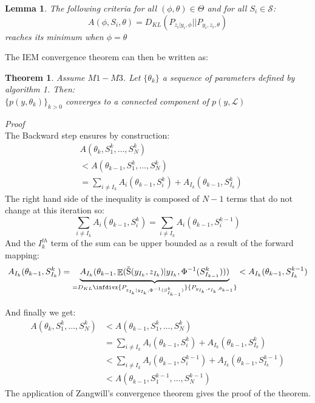 \documentclass{article}
\theoremstyle{plain}
\newtheorem{lemma}{Lemma}
\DeclareMathOperator*{\E}{\mathbb{E}}
\DeclareMathOperator*{\St}{\tilde{S}}
\theoremstyle{plain}
\newtheorem{thm}{Theorem}
\theoremstyle{definition}
\newcommand{\infdiv}{D_{KL}\infdivx}
\begin{document}
\begin{lemma}\label{lma1}
The following criteria for all $(\phi, \theta) \in \Theta$ and for all $S_i \in \mathcal{S}$:
\begin{equation}
 A(\phi,S_i,\theta) = D_{KL}(P_{z_i|y_i,\phi}||P_{y_i,z_i,\theta})
\end{equation}
reaches its minimum when $\phi = \theta$
\end{lemma}

The IEM convergence theorem can then be written as:
\begin{thm}
Assume $M1-M3$. Let $\{\theta_k\}$ a sequence of parameters defined by algorithm 1. Then:\\
$\{p(y,\theta_k)\}_{k>0}$ converges to a connected component of $p(y,\mathcal{L})$

\end{thm}

\textit{Proof}
\\
The Backward step ensures by construction:
\begin{equation}
\begin{split}
& A(\theta_{k},S_1^k,\dots,S_N^k) \\
& < A(\theta_{k-1},S_1^k,\dots,S_N^k)\\
& = \sum_{i \neq I_{k}}{A_i(\theta_{k-1},S_i^k)} + A_{I_{k}}(\theta_{k-1},S_{I_{k}}^k)
\end{split}
\end{equation}
The right hand side of the inequality is composed of $N-1$ terms that do not change at this iteration so:
\begin{equation}
\sum_{i \neq I_{k}}{A_i(\theta_{k-1},S_i^k)}  = \sum_{i \neq I_{k}}{A_i(\theta_{k-1},S_i^{k-1})}
\end{equation}
\noindent And the $I_{k}^{th}$ term of the sum can be upper bounded as a result of the forward mapping:
\begin{equation}
A_{I_{k}}(\theta_{k-1},S_{I_{k}}^k) = \underbrace{A_{I_{k}}(\theta_{k-1},\E(\St(y_{I_{k}},z_{I_{k}})|y_{I_{k}},\Phi^{-1}(S_{I_{k-1}}^k)))}_{= \infdiv{P_{z_{I_{k}}|y_{I_{k}},\Phi^{-1}(S_{I_{k-1}}^{k})}}{P_{y_{I_{k}},z_{I_{k}},\theta_{k-1}}}}  < A_{I_{k}}(\theta_{k-1},S_{I_{k}}^{k-1})
\end{equation}

\noindent And finally we get:
\begin{equation}
\begin{split}
A(\theta_{k},S_1^k,\dots,S_N^k) & < A(\theta_{k-1},S_1^k,\dots,S_N^k)\\
& = \sum_{i \neq I_{k}}{A_i(\theta_{k-1},S_i^k)} + A_{I_{k}}(\theta_{k-1},S_{I_{k}}^k)\\
& < \sum_{i \neq I_{k}}{A_i(\theta_{k-1},S_i^{k-1})} + A_{I_{k}}(\theta_{k-1},S_{I_{k}}^{k-1})\\
& < A(\theta_{k-1},S_1^{k-1},\dots,S_N^{k-1})
\end{split}
\end{equation}
The application of Zangwill's convergence theorem gives the proof of the theorem.
\end{document}
